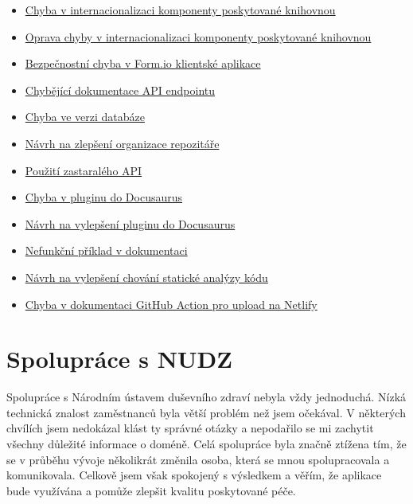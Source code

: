 \begin{itemize}
    \item
    \href{https://github.com/formio/react/issues/522}{Chyba v internacionalizaci komponenty poskytované knihovnou}
    \item
    \href{https://github.com/formio/react/pull/538}{Oprava chyby v internacionalizaci komponenty poskytované knihovnou}
    \item
    \href{https://github.com/formio/formio-app-formio/issues/35}{Bezpečnostní chyba v Form.io klientské aplikace}
    \item
    \href{https://github.com/formio/formio/issues/1555}{Chybějící dokumentace API endpointu}
    \item
    \href{https://github.com/formio/formio/issues/1485}{Chyba ve verzi databáze}
    \item
    \href{https://github.com/formio/formio-app-formio/issues/34}{Návrh na zlepšení organizace repozitáře}
    \item
    \href{https://github.com/formio/react/issues/523}{Použití zastaralého API}
    \item
    \href{https://github.com/tgreyuk/typedoc-plugin-markdown/issues/429}{Chyba v pluginu do Docusaurus}
    \item
    \href{https://github.com/tgreyuk/typedoc-plugin-markdown/issues/440}{Návrh na vylepšení pluginu do Docusaurus}
    \item
    \href{https://github.com/react-bootstrap/react-bootstrap/issues/6671}{Nefunkční příklad v dokumentaci}
    \item
    \href{https://github.com/gajus/eslint-plugin-jsdoc/issues/1138}{Návrh na vylepšení chování statické analýzy kódu}
    \item
    \href{https://github.com/MrFlynn/upload-to-netlify-action/issues/17}{Chyba v dokumentaci GitHub Action pro upload na Netlify}
\end{itemize}


\section{Spolupráce s NUDZ}\label{sec:spoluprace-s-nudz}

Spolupráce s Národním ústavem duševního zdraví nebyla vždy jednoduchá.
Nízká technická znalost zaměstnanců byla větší problém než jsem očekával.
V některých chvílích jsem nedokázal klást ty správné otázky a nepodařilo se mi zachytit všechny důležité informace o doméně.
Celá spolupráce byla značně ztížena tím, že se v průběhu vývoje několikrát změnila osoba, která se mnou spolupracovala a komunikovala.
Celkově jsem však spokojený s výsledkem a věřím, že aplikace bude využívána a pomůže zlepšit kvalitu poskytované péče.
